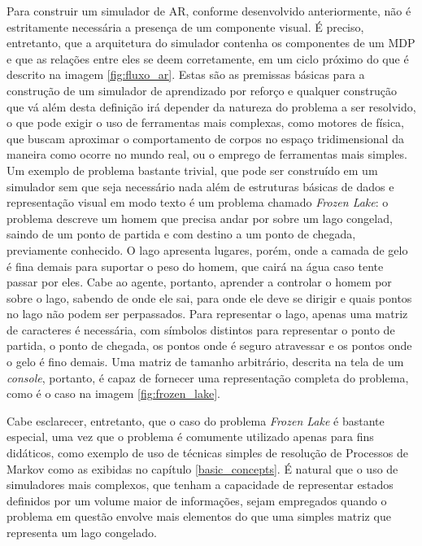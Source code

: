 \documentclass[cic,tc]{iiufrgs}
\begin{document}
Para construir um simulador de AR, conforme desenvolvido anteriormente, não é
estritamente necessária a presença de um componente visual. É preciso,
entretanto, que a arquitetura do simulador contenha os componentes de um MDP e
que as relações entre eles se deem corretamente, em um ciclo próximo do que é
descrito na imagem \ref{fig:fluxo_ar}. Estas são as premissas básicas para a
construção de um simulador de aprendizado por reforço e qualquer construção que
vá além desta definição irá depender da natureza do problema a ser resolvido, o
que pode exigir o uso de ferramentas mais complexas, como motores de física, que
buscam aproximar o comportamento de corpos no espaço tridimensional da maneira
como ocorre no mundo real, ou o emprego de ferramentas mais simples. Um exemplo
de problema bastante trivial, que pode ser construído em um simulador sem que
seja necessário nada além de estruturas básicas de dados e representação visual
em modo texto é um problema chamado \textit{Frozen Lake}: o problema descreve
um homem que precisa andar por sobre um lago congelad, saindo de um ponto de
partida e com destino a um ponto de chegada, previamente conhecido. O lago
apresenta lugares,
porém, onde a camada de gelo é fina demais para suportar o peso do homem, que
cairá na água caso tente passar por eles. Cabe ao agente, portanto, aprender a
controlar o homem por sobre o lago, sabendo de onde ele sai, para onde ele deve
se dirigir e quais pontos no lago não podem ser perpassados. Para representar o
lago, apenas uma matriz de caracteres é necessária, com símbolos distintos para
representar o ponto de partida, o ponto de chegada, os pontos onde é seguro
atravessar e os pontos onde o gelo é fino demais. Uma matriz de tamanho
arbitrário, descrita na tela de um \textit{console}, portanto, é capaz de
fornecer uma representação completa do problema, como é o caso na imagem
\ref{fig:frozen_lake}.


Cabe esclarecer, entretanto, que o caso do problema \textit{Frozen Lake} é
bastante especial, uma vez que o problema é comumente utilizado apenas para fins
didáticos, como exemplo de uso de técnicas simples de resolução de Processos de
Markov como as exibidas no capítulo \ref{basic_concepts}. É natural que o uso
de simuladores mais complexos, que tenham a capacidade de representar estados
definidos por um volume maior de informações, sejam empregados quando o problema
em questão envolve mais elementos do que uma simples matriz que representa um
lago congelado.
\end{document}
